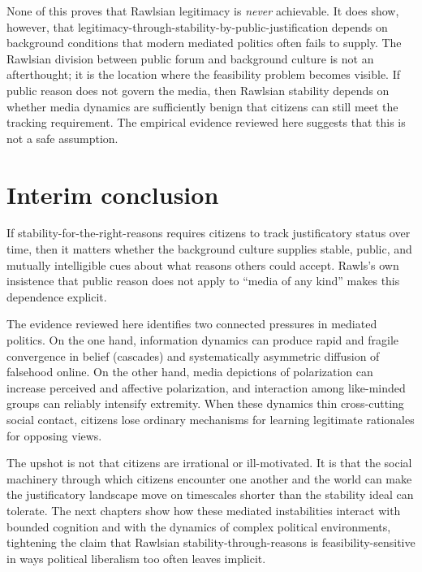\documentclass[12pt]{report}
\begin{document}
None of this proves that Rawlsian legitimacy is \emph{never} achievable. It does show, however, that legitimacy-through-stability-by-public-justification depends on background conditions that modern mediated politics often fails to supply. The Rawlsian division between public forum and background culture is not an afterthought; it is the location where the feasibility problem becomes visible. If public reason does not govern the media,\parencite[p.~768]{rawls1997public} then Rawlsian stability depends on whether media dynamics are sufficiently benign that citizens can still meet the tracking requirement. The empirical evidence reviewed here suggests that this is not a safe assumption.

\section{Interim conclusion}\label{sec:ch5-interim}

If stability-for-the-right-reasons requires citizens to track justificatory status over time, then it matters whether the background culture supplies stable, public, and mutually intelligible cues about what reasons others could accept. Rawls’s own insistence that public reason does not apply to \enquote{media of any kind} makes this dependence explicit.\parencite[p.~768]{rawls1997public}

The evidence reviewed here identifies two connected pressures in mediated politics. On the one hand, information dynamics can produce rapid and fragile convergence in belief (cascades) and systematically asymmetric diffusion of falsehood online.\parencite[pp.~992, 996]{bikhchandaniHirshleiferWelch1992cascades}\parencite[p.~1146]{vosoughiRoyAral2018falseNews} On the other hand, media depictions of polarization can increase perceived and affective polarization,\parencite[pp.~290, 292]{levenduskyMalhotra2016polarization} and interaction among like-minded groups can reliably intensify extremity.\parencite[p.~176]{sunstein2002groupPolarization} When these dynamics thin cross-cutting social contact, citizens lose ordinary mechanisms for learning legitimate rationales for opposing views.\parencite[pp.~111, 118, 122]{mutz2002crosscutting}

The upshot is not that citizens are irrational or ill-motivated. It is that the social machinery through which citizens encounter one another and the world can make the justificatory landscape move on timescales shorter than the stability ideal can tolerate. The next chapters show how these mediated instabilities interact with bounded cognition and with the dynamics of complex political environments, tightening the claim that Rawlsian stability-through-reasons is feasibility-sensitive in ways political liberalism too often leaves implicit.
\end{document}
